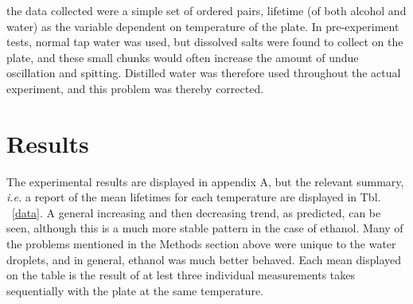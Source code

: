 \documentclass[aps,pre,twocolumn,nofootinbib]{revtex4}
\begin{document}
the data collected were a simple set of ordered pairs, lifetime (of both alcohol and water) as the variable dependent on temperature of the plate.  In pre-experiment tests, normal tap water was used, but dissolved salts were found to collect on the plate, and these small chunks would often increase the amount of undue oscillation and spitting.  Distilled water was therefore used throughout the actual experiment, and this problem was thereby corrected.  

\section{Results}

The experimental results are displayed in appendix A, but the relevant summary, \textit{i.e.} a report of the mean lifetimes for each temperature are displayed in Tbl. ~\ref{data}.  A general increasing and then decreasing trend, as predicted, can be seen, although this is a much more stable pattern in the case of ethanol.  Many of the problems mentioned in the Methods section above were unique to the water droplets, and in general, ethanol was much better behaved.  Each mean displayed on the table is the result of at lest three individual measurements takes sequentially with the plate at the same temperature.  
\end{document}
